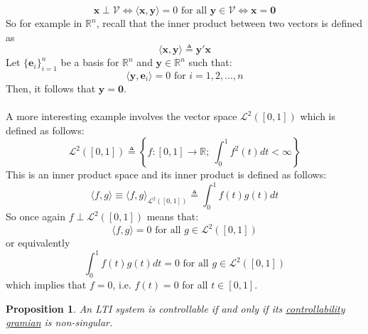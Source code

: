 \documentclass[a4paper,10pt,oneside]{book}
\newtheorem{proposition}[theorem]{Proposition}
\begin{document}
\begin{equation}
 \mathbf{x}\perp \mathcal{V} \Leftrightarrow \langle\mathbf{x},\mathbf{y} \rangle=0 \text{ for all } \mathbf{y}\in\mathcal{V} \Leftrightarrow \mathbf{x}=\mathbf{0}
\end{equation}
So for example in $\mathbb{R}^n$, recall that the inner product between two vectors is defined as 
\begin{equation}
 \langle\mathbf{x},\mathbf{y} \rangle\triangleq \mathbf{y}'\mathbf{x}
\end{equation}
Let $\{\mathbf{e}_i\}_{i=1}^n$ be a basis for $\mathbb{R}^n$ and $\mathbf{y}\in\mathbb{R}^n$ such that:
\begin{equation}
 \langle\mathbf{y},\mathbf{e}_i \rangle=0 \text{ for } i=1,2,\ldots,n
\end{equation}
Then, it follows that $\mathbf{y}=\mathbf{0}$. \\
\\
A more interesting example involves the vector space $\mathcal{L}^2([0,1])$ which is defined as follows:
\begin{equation}
 \mathcal{L}^2([0,1])\triangleq\left\{f:[0,1]\rightarrow\mathbb{R};\ \int_0^1 f^2(t)dt <\infty\right\}
\end{equation}
This is an inner product space and its inner product is defined as follows:
\begin{equation}
 \langle f,g \rangle \equiv\langle f,g \rangle_{\mathcal{L}^2([0,1])}\triangleq \int_0^1 f(t)g(t)dt
\end{equation}
So once again $f \perp \mathcal{L}^2([0,1])$ means that:
\begin{equation}
 \langle f,g \rangle =0 \text { for all } g \in \mathcal{L}^2([0,1])
\end{equation}
or equivalently
\begin{equation}
 \int_0^1 f(t)g(t)dt =0 \text { for all } g \in \mathcal{L}^2([0,1])
\end{equation}
which implies that $f=0$, i.e. $f(t)=0$ for all $t\in[0,1]$.
\begin{proposition}
 An LTI system is controllable if and only if its \hyperlink{def:contrGramian}{controllability gramian} is non-singular.
\end{proposition}
\end{document}
